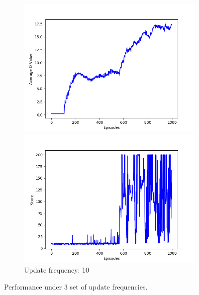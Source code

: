 \documentclass{article}
\begin{document}
\begin{figure}[!htbp]
  \begin{subfigure}{\textwidth}
    \begin{minipage}{0.5\textwidth}
      \centering
      \includegraphics[scale=0.45]{../experiments/update_fq_10/qvalues.png}
    \end{minipage}
    \begin{minipage}{0.5\textwidth}
      \centering
      \includegraphics[scale=0.45]{../experiments/update_fq_10/scores.png}
    \end{minipage}
    \caption{Update frequency: 10}
  \end{subfigure}%
  \caption{Performance under 3 set of update frequencies.}
  \label{update frequency}
\end{figure}
\end{document}
